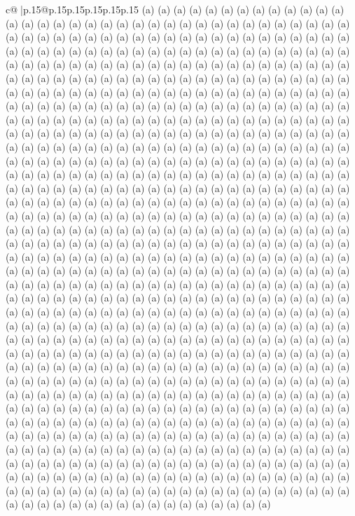 \documentclass{article}
\begin{document}
{\begin{supertabular}{c@{$\;$}|p{.15\linewidth}@{}p{.15\linewidth}p{.15\linewidth}p{.15\linewidth}p{.15\linewidth}p{.15\linewidth}}
{{{(a) (a) (a) (a) (a) (a) (a) (a) (a) (a) (a) (a) (a) (a) (a) (a) (a) (a) (a) (a) (a) (a) (a) (a) (a) (a) (a) (a) (a) (a) (a) (a) (a) (a) (a) (a) (a) (a) (a) (a) (a) (a) (a) (a) (a) (a) (a) (a) (a) (a) (a) (a) (a) (a) (a) (a) (a) (a) (a) (a) (a) (a) (a) (a) (a) (a) (a) (a) (a) (a) (a) (a) (a) (a) (a) (a) (a) (a) (a) (a) (a) (a) (a) (a) (a) (a) (a) (a) (a) (a) (a) (a) (a) (a) (a) (a) (a) (a) (a) (a) (a) (a) (a) (a) (a) (a) (a) (a) (a) (a) (a) (a) (a) (a) (a) (a) (a) (a) (a) (a) (a) (a) (a) (a) (a) (a) (a) (a) (a) (a) (a) (a) (a) (a) (a) (a) (a) (a) (a) (a) (a) (a) (a) (a) (a) (a) (a) (a) (a) (a) (a) (a) (a) (a) (a) (a) (a) (a) (a) (a) (a) (a) (a) (a) (a) (a) (a) (a) (a) (a) (a) (a) (a) (a) (a) (a) (a) (a) (a) (a) (a) (a) (a) (a) (a) (a) (a) (a) (a) (a) (a) (a) (a) (a) (a) (a) (a) (a) (a) (a) (a) (a) (a) (a) (a) (a) (a) (a) (a) (a) (a) (a) (a) (a) (a) (a) (a) (a) (a) (a) (a) (a) (a) (a) (a) (a) (a) (a) (a) (a) (a) (a) (a) (a) (a) (a) (a) (a) (a) (a) (a) (a) (a) (a) (a) (a) (a) (a) (a) (a) (a) (a) (a) (a) (a) (a) (a) (a) (a) (a) (a) (a) (a) (a) (a) (a) (a) (a) (a) (a) (a) (a) (a) (a) (a) (a) (a) (a) (a) (a) (a) (a) (a) (a) (a) (a) (a) (a) (a) (a) (a) (a) (a) (a) (a) (a) (a) (a) (a) (a) (a) (a) (a) (a) (a) (a) (a) (a) (a) (a) (a) (a) (a) (a) (a) (a) (a) (a) (a) (a) (a) (a) (a) (a) (a) (a) (a) (a) (a) (a) (a) (a) (a) (a) (a) (a) (a) (a) (a) (a) (a) (a) (a) (a) (a) (a) (a) (a) (a) (a) (a) (a) (a) (a) (a) (a) (a) (a) (a) (a) (a) (a) (a) (a) (a) (a) (a) (a) (a) (a) (a) (a) (a) (a) (a) (a) (a) (a) (a) (a) (a) (a) (a) (a) (a) (a) (a) (a) (a) (a) (a) (a) (a) (a) (a) (a) (a) (a) (a) (a) (a) (a) (a) (a) (a) (a) (a) (a) (a) (a) (a) (a) (a) (a) (a) (a) (a) (a) (a) (a) (a) (a) (a) (a) (a) (a) (a) (a) (a) (a) (a) (a) (a) (a) (a) (a) (a) (a) (a) (a) (a) (a) (a) (a) (a) (a) (a) (a) (a) (a) (a) (a) (a) (a) (a) (a) (a) (a) (a) (a) (a) (a) (a) (a) (a) (a) (a) (a) (a) (a) (a) (a) (a) (a) (a) (a) (a) (a) (a) (a) (a) (a) (a) (a) (a) (a) (a) (a) (a) (a) (a) (a) (a) (a) (a) (a) (a) (a) (a) (a) (a) (a) (a) (a) (a) (a) (a) (a) (a) (a) (a) (a) (a) (a) (a) (a) (a) (a) (a) (a) (a) (a) (a) (a) (a) (a) (a) (a) (a) (a) (a) (a) (a) (a) (a) (a) (a) (a) (a) (a) (a) (a) (a) (a) (a) (a) (a) (a) (a) (a) (a) (a) (a) (a) (a) (a) (a) (a) (a) (a) (a) (a) (a) (a) (a) (a) (a) (a) (a) (a) (a) (a) (a) (a) (a) (a) (a) (a) (a) (a) (a) (a) (a) (a) (a) (a) (a) (a) (a) (a) (a) (a) (a) (a) (a) (a) (a) (a) (a) (a) (a) (a) (a) (a) (a) (a) (a) (a) (a) (a) (a) (a) (a) (a) (a) (a) (a) (a) (a) (a) (a) (a) (a) (a) (a) (a) (a) (a) (a) (a) (a) (a) (a) (a) (a) (a) (a) (a) (a) (a) (a) (a) (a) (a) (a) (a) (a) (a) (a) (a) (a) (a) (a) (a) (a) (a) (a) (a) (a) (a) (a) (a) (a) (a) (a) (a) (a) (a) (a) (a) (a) (a) (a) (a) (a) (a) (a) (a) (a) (a) (a) (a) (a) (a) (a) (a) (a) (a) (a) (a) (a) (a) (a) (a) (a) (a) (a) (a) (a) (a) (a) (a) (a) (a) (a) (a) (a) (a) (a) (a) (a) (a) (a) (a) (a) (a) (a) (a) (a) (a) (a) (a) (a) (a) (a) (a) (a) (a) (a) (a) (a) (a) (a) (a) (a) (a) (a) (a) (a) (a) (a) (a) (a) (a) (a) (a) (a) (a) (a) (a) (a) (a) (a) (a) (a) (a) (a) (a) (a) (a) (a) (a) (a) (a) (a) (a) (a) (a) (a) (a) (a) (a) (a) (a) (a) (a) (a) (a) (a) (a) (a) (a) (a) (a) (a) (a) (a) (a) (a) (a) (a) (a) (a) (a) (a) (a) (a) (a) (a) (a) }}}
\end{supertabular}}
\end{document}
